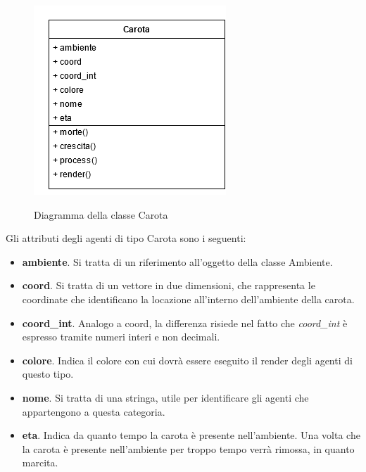 \documentclass[11pt]{article}
\begin{document}
\begin{figure}[h!]
     \centering
     \includegraphics[scale = 0.7]{Carota.png}
     \label{fig:carotaUML}
     \caption{Diagramma della classe Carota}
\end{figure}
 Gli attributi degli agenti di tipo Carota sono i seguenti: 
\begin{itemize}
    \item \textbf{ambiente}. Si tratta di un riferimento all'oggetto della classe Ambiente. 
    \item \textbf{coord}. Si tratta di un vettore in due dimensioni, che rappresenta le coordinate che identificano la locazione all'interno dell'ambiente della carota. 
    \item \textbf{coord\_int}. Analogo a coord, la differenza risiede nel fatto che \emph{coord\_int} è espresso tramite numeri interi e non decimali. 
    \item \textbf{colore}. Indica il colore con cui dovrà essere eseguito il render degli agenti di questo tipo.
    \item \textbf{nome}. Si tratta di una stringa, utile per identificare gli agenti che appartengono a questa categoria. 
    \item \textbf{eta}. Indica da quanto tempo la carota è presente nell'ambiente. Una volta che la carota è presente nell'ambiente per troppo tempo verrà rimossa, in quanto marcita. 
\end{itemize}
\end{document}

